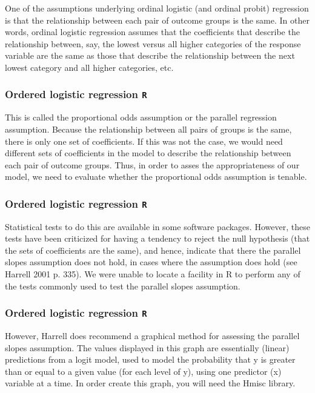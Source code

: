 \documentclass[00-GLMregslides.tex]{subfiles}
\begin{document}
	
\begin{frame}
One of the assumptions underlying ordinal logistic (and ordinal probit) regression is that the relationship between each pair of outcome groups is the same. In other words, ordinal logistic regression assumes that the coefficients that describe the relationship between, say, the lowest versus all higher categories of the response variable are the same as those that describe the relationship between the next lowest category and all higher categories, etc. 
\end{frame}
\begin{frame}[fragile]
	\frametitle{Ordered logistic regression \texttt{R} }
	\Large

This is called the proportional odds assumption or the parallel regression assumption. Because the relationship between all pairs of groups is the same, there is only one set of coefficients. If this was not the case, we would need different sets of coefficients in the model to describe the relationship between each pair of outcome groups. Thus, in order to asses the appropriateness of our model, we need to evaluate whether the proportional odds assumption is tenable. 
\end{frame}
\begin{frame}[fragile]
	\frametitle{Ordered logistic regression \texttt{R} }
	\Large
	Statistical tests to do this are available in some software packages. However, these tests have been criticized for having a tendency to reject the null hypothesis (that the sets of coefficients are the same), and hence, indicate that there the parallel slopes assumption does not hold, in cases where the assumption does hold (see Harrell 2001 p. 335). We were unable to locate a facility in R to perform any of the tests commonly used to test the parallel slopes assumption. 

\end{frame}
\begin{frame}[fragile]
	\frametitle{Ordered logistic regression \texttt{R} }
	\Large
	However, Harrell does recommend a graphical method for assessing the parallel slopes assumption. The values displayed in this graph are essentially (linear) predictions from a logit model, used to model the probability that y is greater than or equal to a given value (for each level of y), using one predictor (x) variable at a time. In order create this graph, you will need the Hmisc library.
\end{frame}
\end{document}
